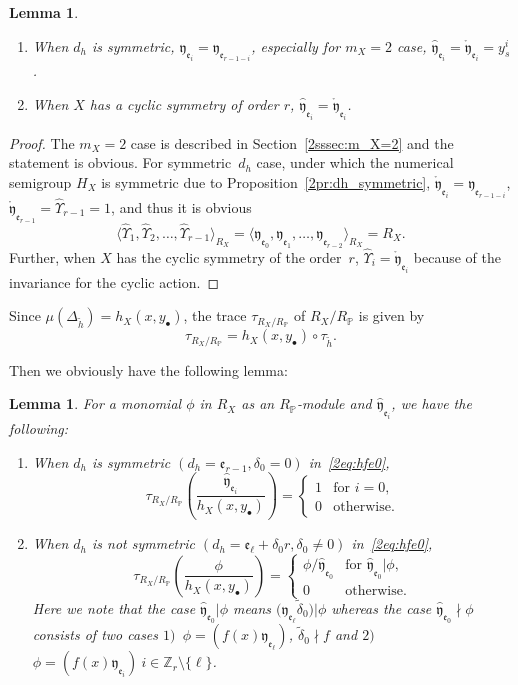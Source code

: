 \documentclass[pdftex]{sigma}
\def\ZZ{{\mathbb Z}}
\def\PP{{\mathbb P}}
\def\fe{{\mathfrak e}}
\def\fy{{\mathfrak y}}
\def\th{{\widetilde h}}
\def\tdelta{{\widetilde \delta}}
\def\hfy{{\widehat{\mathfrak y}}}
\def\hUpsilon{{\widehat \Upsilon}}
\def\rfy{{\mathring{\mathfrak y}}}
\numberwithin{equation}{section}
\newtheorem{Lemma}[Theorem]{Lemma}
\begin{document}
\begin{Lemma}\label{2lm:Emp_hfy_e}\quad
\begin{enumerate}\itemsep=0pt
\item[$1.$] When $d_h$ is symmetric, $\hfy_{\fe_i}=\fy_{\fe_{r-1-i}}$, especially for $m_X=2$ case, $\hfy_{\fe_i}=\rfy_{\fe_i}=y_s^i$.

\item[$2.$] When $X$ has a cyclic symmetry of order $r$, $\hfy_{\fe_i}=\rfy_{\fe_i}$.
\end{enumerate}
\end{Lemma}

\begin{proof}The $m_X=2$ case is described in Section~\ref{2sssec:m_X=2} and the statement is obvious.
For symmetric~$d_h$ case, under which the numerical semigroup $H_X$ is symmetric due to Proposition~\ref{2pr:dh_symmetric}, $\rfy_{\fe_i}=\fy_{\fe_{r-1-i}}$, $\rfy_{\fe_{r-1}}=\hUpsilon_{r-1}=1$, and thus it is obvious
\[
\big\langle \hUpsilon_{1}, \hUpsilon_{2}, \dots, \hUpsilon_{r-1}\big\rangle_{R_X}
=\langle \fy_{\fe_0}, \fy_{\fe_1}, \dots, \fy_{\fe_{r-2}}\rangle_{R_X}=R_X.
\]
Further, when $X$ has the cyclic symmetry of the order~$r$, $\hUpsilon_{i}= \rfy_{\fe_i}$ because of the invariance for the cyclic action.
\end{proof}

Since $\mu(\Delta_{\th})=h_X(x, y_\bullet)$, the trace $\tau_{R_X/R_\PP}$ of $R_X/R_\PP$ is given by
\[
\tau_{R_X/R_\PP}= h_X(x, y_\bullet)\circ \tau_\th.
\]

Then we obviously have the following lemma:
\begin{Lemma}\label{2lm:tau_RXRP_phi}
For a monomial $\phi$ in $R_X$ as an $R_\PP$-module and $\hfy_{\fe_i}$, we have the following:
\begin{enumerate}\itemsep=0pt

\item[$1.$] When $d_h$ is symmetric $(d_h= \fe_{r-1}, \delta_0=0)$ in~\eqref{2eq:hfe0},
\[
\tau_{R_X/R_\PP}
\left(\frac{\hfy_{\fe_i}}{h_X(x, y_\bullet)}\right)
=
\begin{cases}
1 & \text{for } i=0,\\
0 & \text{otherwise}.
\end{cases}
\]

\item[$2.$] When $d_h$ is not symmetric $(d_h= \fe_\ell + \delta_0 r, \delta_0\neq0)$ in~\eqref{2eq:hfe0},
\[
\tau_{R_X/R_\PP}
\left(\frac{\phi}{h_X(x, y_\bullet)}\right)
=
\begin{cases}
\phi/\hfy_{\fe_0}
& \text{for } \hfy_{\fe_0}|\phi, \\
0 & \text{otherwise}.
\end{cases}
\]
Here we note that the case $\hfy_{\fe_0}|\phi$ means $\big(\fy_{\fe_\ell}\tdelta_0\big)|\phi$ whereas the case $\hfy_{\fe_0}\nmid \phi$ consists of two cases $1)$~$\phi = (f(x) \fy_{\fe_\ell})$, $\tdelta_0\nmid f$ and $2)$ $\phi = (f(x) \fy_{\fe_i})\ i \in \ZZ_r\setminus \{\ell\}$.
\end{enumerate}
\end{Lemma}
\end{document}

